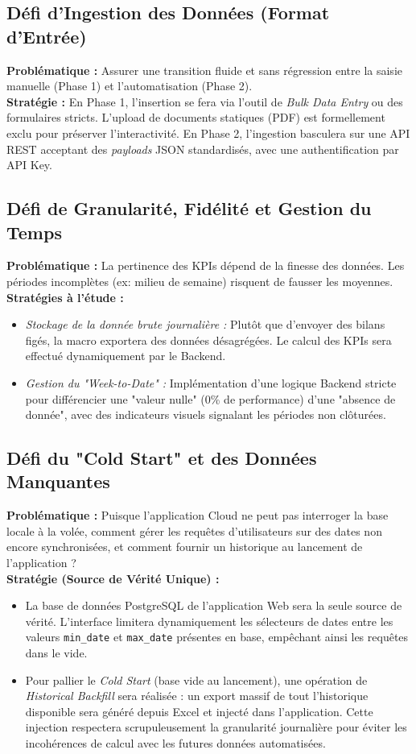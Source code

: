 \subsection{Défi d'Ingestion des Données (Format d'Entrée)}
\textbf{Problématique :} Assurer une transition fluide et sans régression entre la saisie manuelle (Phase 1) et l'automatisation (Phase 2). \\
\textbf{Stratégie :} En Phase 1, l'insertion se fera via l'outil de \textit{Bulk Data Entry} ou des formulaires stricts. L'upload de documents statiques (PDF) est formellement exclu pour préserver l'interactivité. En Phase 2, l'ingestion basculera sur une API REST acceptant des \textit{payloads} JSON standardisés, avec une authentification par API Key.

\subsection{Défi de Granularité, Fidélité et Gestion du Temps}
\textbf{Problématique :} La pertinence des KPIs dépend de la finesse des données. Les périodes incomplètes (ex: milieu de semaine) risquent de fausser les moyennes. \\
\textbf{Stratégies à l'étude :}
\begin{itemize}
    \item \textit{Stockage de la donnée brute journalière :} Plutôt que d'envoyer des bilans figés, la macro exportera des données désagrégées. Le calcul des KPIs sera effectué dynamiquement par le Backend.
    \item \textit{Gestion du "Week-to-Date" :} Implémentation d'une logique Backend stricte pour différencier une "valeur nulle" (0\% de performance) d'une "absence de donnée", avec des indicateurs visuels signalant les périodes non clôturées.
\end{itemize}

\subsection{Défi du "Cold Start" et des Données Manquantes}
\textbf{Problématique :} Puisque l'application Cloud ne peut pas interroger la base locale à la volée, comment gérer les requêtes d'utilisateurs sur des dates non encore synchronisées, et comment fournir un historique au lancement de l'application ? \\
\textbf{Stratégie (Source de Vérité Unique) :}
\begin{itemize}
    \item La base de données PostgreSQL de l'application Web sera la seule source de vérité. L'interface limitera dynamiquement les sélecteurs de dates entre les valeurs \texttt{min\_date} et \texttt{max\_date} présentes en base, empêchant ainsi les requêtes dans le vide.
    \item Pour pallier le \textit{Cold Start} (base vide au lancement), une opération de \textit{Historical Backfill} sera réalisée : un export massif de tout l'historique disponible sera généré depuis Excel et injecté dans l'application. Cette injection respectera scrupuleusement la granularité journalière pour éviter les incohérences de calcul avec les futures données automatisées.
\end{itemize}

